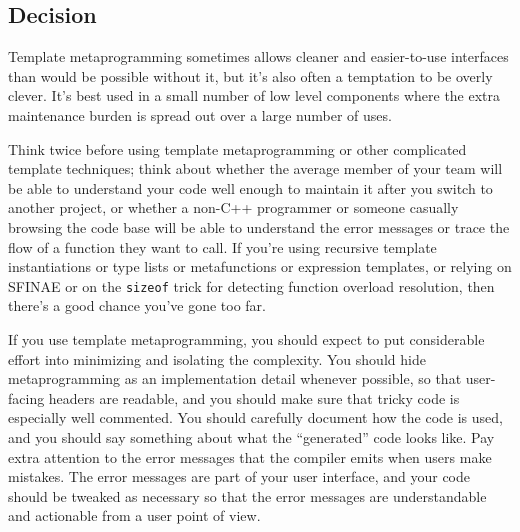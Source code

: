 \subsection{Decision}
Template metaprogramming sometimes allows cleaner and easier-to-use interfaces than would be possible without it, but it's also often a temptation to be overly clever. It's best used in a small number of low level components where the extra maintenance burden is spread out over a large number of uses.

Think twice before using template metaprogramming or other complicated template techniques; think about whether the average member of your team will be able to understand your code well enough to maintain it after you switch to another project, or whether a non-C++ programmer or someone casually browsing the code base will be able to understand the error messages or trace the flow of a function they want to call. If you're using recursive template instantiations or type lists or metafunctions or expression templates, or relying on SFINAE or on the \texttt{sizeof} trick for detecting function overload resolution, then there's a good chance you've gone too far.

If you use template metaprogramming, you should expect to put considerable effort into minimizing and isolating the complexity. You should hide metaprogramming as an implementation detail whenever possible, so that user-facing headers are readable, and you should make sure that tricky code is especially well commented. You should carefully document how the code is used, and you should say something about what the \enquote{generated} code looks like. Pay extra attention to the error messages that the compiler emits when users make mistakes. The error messages are part of your user interface, and your code should be tweaked as necessary so that the error messages are understandable and actionable from a user point of view.
